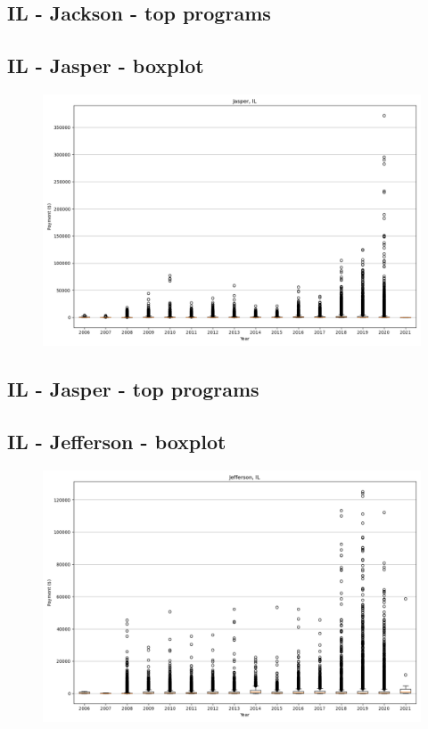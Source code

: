 \subsection*{IL - Jackson - top programs}

\newpage
\subsection*{IL - Jasper - boxplot}
\begin{figure}[h]
\centering
\includegraphics[width=7in]{../output/boxplots/counties/Jasper-IL_boxplot.png}
\end{figure}


\subsection*{IL - Jasper - top programs}

\newpage
\subsection*{IL - Jefferson - boxplot}
\begin{figure}[h]
\centering
\includegraphics[width=7in]{../output/boxplots/counties/Jefferson-IL_boxplot.png}
\end{figure}


